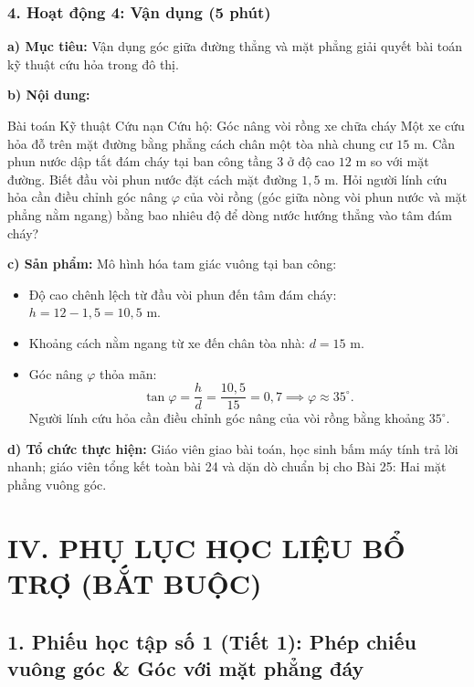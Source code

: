 \documentclass[12pt, a4paper]{article}
\begin{document}
\subsubsection*{4. Hoạt động 4: Vận dụng (5 phút)}

\noindent \textbf{a) Mục tiêu:}
Vận dụng góc giữa đường thẳng và mặt phẳng giải quyết bài toán kỹ thuật cứu hỏa trong đô thị.

\noindent \textbf{b) Nội dung:}
\begin{stembox}{Bài toán Kỹ thuật Cứu nạn Cứu hộ: Góc nâng vòi rồng xe chữa cháy}
Một xe cứu hỏa đỗ trên mặt đường bằng phẳng cách chân một tòa nhà chung cư $15\text{ m}$. Cần phun nước dập tắt đám cháy tại ban công tầng 3 ở độ cao $12\text{ m}$ so với mặt đường. Biết đầu vòi phun nước đặt cách mặt đường $1{,}5\text{ m}$.
Hỏi người lính cứu hỏa cần điều chỉnh góc nâng $\varphi$ của vòi rồng (góc giữa nòng vòi phun nước và mặt phẳng nằm ngang) bằng bao nhiêu độ để dòng nước hướng thẳng vào tâm đám cháy?
\end{stembox}

\noindent \textbf{c) Sản phẩm:}
Mô hình hóa tam giác vuông tại ban công:
\begin{itemize}
    \item Độ cao chênh lệch từ đầu vòi phun đến tâm đám cháy: $h = 12 - 1{,}5 = 10{,}5\text{ m}$.
    \item Khoảng cách nằm ngang từ xe đến chân tòa nhà: $d = 15\text{ m}$.
    \item Góc nâng $\varphi$ thỏa mãn:
    $$\tan \varphi = \dfrac{h}{d} = \dfrac{10{,}5}{15} = 0{,}7 \implies \varphi \approx 35^\circ.$$
    Người lính cứu hỏa cần điều chỉnh góc nâng của vòi rồng bằng khoảng $35^\circ$.
\end{itemize}

\noindent \textbf{d) Tổ chức thực hiện:}
Giáo viên giao bài toán, học sinh bấm máy tính trả lời nhanh; giáo viên tổng kết toàn bài 24 và dặn dò chuẩn bị cho Bài 25: Hai mặt phẳng vuông góc.

\vspace{10pt}

\section*{IV. PHỤ LỤC HỌC LIỆU BỔ TRỢ (BẮT BUỘC)}

\subsection*{1. Phiếu học tập số 1 (Tiết 1): Phép chiếu vuông góc \& Góc với mặt phẳng đáy}
\end{document}
